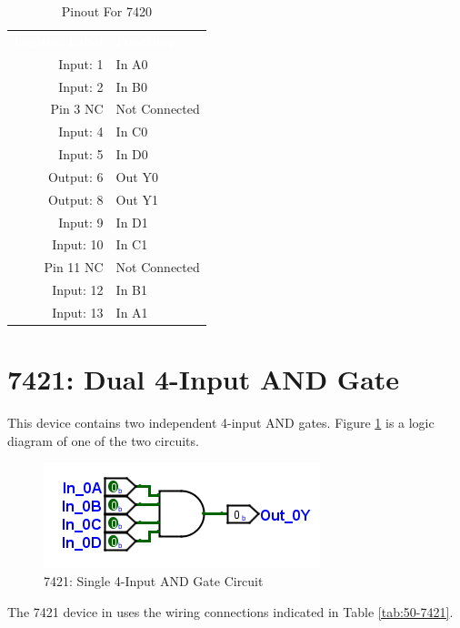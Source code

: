\begin{table}[H]
	\sffamily
	\newcommand{\head}[1]{\textcolor{white}{\textbf{#1}}}		
	\begin{center}
		\begin{tabular}{rl} 
			\rowcolor{black!75}
			\head{Logisim Label} & \head{Function} \\
			Input: 1   & In A0  \\
			Input: 2   & In B0  \\
			Pin 3 NC   & Not Connected \\
			Input: 4   & In C0  \\
			Input: 5   & In D0  \\
			Output: 6  & Out Y0 \\
			Output: 8  & Out Y1 \\
			Input: 9   & In D1  \\
			Input: 10  & In C1  \\
			Pin 11 NC  & Not Connected \\
			Input: 12 & In B1  \\
			Input: 13  & In A1  \\
		\end{tabular}
	\end{center}
	\caption{Pinout For 7420}
	\label{tab:50-7420}
\end{table}

\section{7421: Dual 4-Input AND Gate}

This device contains two independent 4-input AND gates. Figure \ref{fig:app_ttl-7421} is a logic diagram of one of the two circuits.

\begin{figure}[H]
	\centering
	\includegraphics{gfx/app_ttl-7421}
	\caption{7421: Single 4-Input AND Gate Circuit}
	\label{fig:app_ttl-7421}
\end{figure}

The 7421 device in \LE uses the wiring connections indicated in Table \ref{tab:50-7421}.

